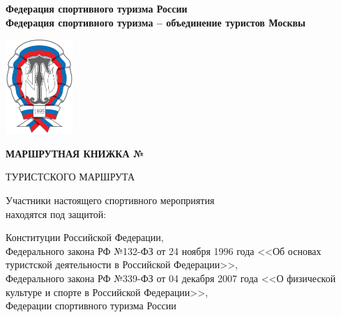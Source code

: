 \documentclass[a5paper, 12pt, twoside]{article}
\begin{document}
    \thispagestyle{empty}
    
    {\centering\bf%
    Федерация спортивного туризма России\\Федерация спортивного туризма – объединение туристов Москвы\par}
    \vspace{1cm}

    {\hfil\includegraphics[height=3.6cm]{ FSTR_logo.png }\hfil{}\hfil\par}
    \vspace{1cm}

    {\centering\Large\bf%
    МАРШРУТНАЯ КНИЖКА №\phantom{10000}\par}

    {\centering%
    ТУРИСТСКОГО МАРШРУТА\par}
    \vspace{1.5cm}
        
    {\centering%
    Участники настоящего спортивного мероприятия\\
    находятся под защитой:\par}
    \vspace{0.7cm}

    {\centering%
    Конституции Российской Федерации,\\
    Федерального закона РФ №132-ФЗ от 24 ноября 1996 года <<Об основах туристской деятельности в Российской Федерации>>,\\
    Федерального закона РФ №339-ФЗ от 04 декабря 2007 года <<О физической культуре и спорте в Российской Федерации>>,\\
    Федерации спортивного туризма России\par}
    \vspace{3cm}
\end{document}
